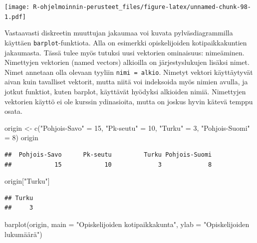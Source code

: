 \documentclass[
]{book}
\newenvironment{Shaded}{\begin{snugshade}}{\end{snugshade}}
\newcommand{\AttributeTok}[1]{\textcolor[rgb]{0.77,0.63,0.00}{#1}}
\newcommand{\DecValTok}[1]{\textcolor[rgb]{0.00,0.00,0.81}{#1}}
\newcommand{\FunctionTok}[1]{\textcolor[rgb]{0.00,0.00,0.00}{#1}}
\newcommand{\NormalTok}[1]{#1}
\newcommand{\OtherTok}[1]{\textcolor[rgb]{0.56,0.35,0.01}{#1}}
\newcommand{\StringTok}[1]{\textcolor[rgb]{0.31,0.60,0.02}{#1}}
\begin{document}
\texttt{[image: R-ohjelmoinnin-perusteet\_files/figure-latex/unnamed-chunk-98-1.pdf]}

Vastaavasti diskreetin muuttujan jakaumaa voi kuvata pylväsdiagrammilla käyttäen \texttt{barplot}-funktiota. Alla on esimerkki opiskelijoiden kotipaikkakuntien jakaumasta. Tässä tulee myös tutuksi uusi vektorien ominaisuus: nimeäminen. Nimettyjen vektorien (named vectors) alkioilla on järjestyslukujen lisäksi nimet. Nimet annetaan olla olevaan tyyliin \texttt{nimi\ =\ alkio}. Nimetyt vektori käyttäytyvät aivan kuin tavalliset vektorit, mutta niitä voi indeksoida myös nimien avulla, ja jotkut funktiot, kuten barplot, käyttävät hyödyksi alkioiden nimiä. Nimettyjen vektorien käyttö ei ole kurssin ydinasioita, mutta on joskus hyvin kätevä temppu osata.

\begin{Shaded}
\begin{Highlighting}[]
\NormalTok{origin }\OtherTok{\textless{}{-}} \FunctionTok{c}\NormalTok{(}\StringTok{"Pohjois{-}Savo"} \OtherTok{=} \DecValTok{15}\NormalTok{, }\StringTok{"Pk{-}seutu"} \OtherTok{=} \DecValTok{10}\NormalTok{, }\StringTok{"Turku"} \OtherTok{=} \DecValTok{3}\NormalTok{,}
            \StringTok{"Pohjois{-}Suomi"} \OtherTok{=} \DecValTok{8}\NormalTok{)}
\NormalTok{origin}
\end{Highlighting}
\end{Shaded}

\begin{verbatim}
##  Pohjois-Savo      Pk-seutu         Turku Pohjois-Suomi 
##            15            10             3             8
\end{verbatim}

\begin{Shaded}
\begin{Highlighting}[]
\NormalTok{origin[}\StringTok{"Turku"}\NormalTok{]}
\end{Highlighting}
\end{Shaded}

\begin{verbatim}
## Turku 
##     3
\end{verbatim}

\begin{Shaded}
\begin{Highlighting}[]
\FunctionTok{barplot}\NormalTok{(origin, }
        \AttributeTok{main =} \StringTok{"Opiskelijoiden kotipaikkakunta"}\NormalTok{,}
        \AttributeTok{ylab =} \StringTok{"Opiskelijoiden lukumäärä"}\NormalTok{)}
\end{Highlighting}
\end{Shaded}
\end{document}

